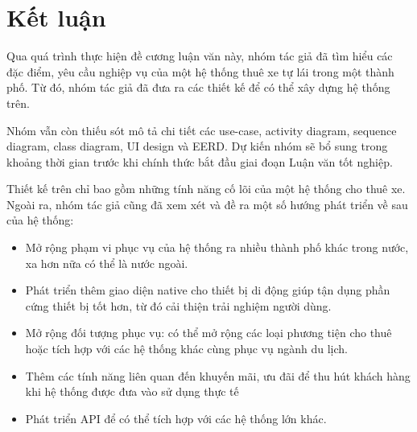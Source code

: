 \documentclass[../main.tex]{subfiles}
\begin{document}
	\chapter{Kết luận}
	\label{chap:conclusion}

	\justifying

	Qua quá trình thực hiện đề cương luận văn này, nhóm tác giả đã tìm hiểu các đặc điểm, yêu cầu nghiệp vụ của một hệ
	thống thuê xe tự lái trong một thành phố. Từ đó, nhóm tác giả đã đưa ra các thiết kế để có thể xây dựng hệ thống trên.

	Nhóm vẫn còn thiếu sót mô tả chi tiết các use-case, activity diagram, sequence diagram, class diagram, UI design và
	EERD. Dự kiến nhóm sẽ bổ sung trong khoảng thời gian trước khi chính thức bắt đầu giai đoạn Luận văn tốt nghiệp.

	Thiết kế trên chỉ bao gồm những tính năng cố lõi của một hệ thống cho thuê xe. Ngoài ra, nhóm tác giả cũng đã xem
	xét và đề ra một số hướng phát triển về sau của hệ thống:

	\begin{itemize}
		\item Mở rộng phạm vi phục vụ của hệ thống ra nhiều thành phố khác trong nước, xa hơn nữa có thể là nước ngoài.
		\item Phát triển thêm giao diện native cho thiết bị di động giúp tận dụng phần cứng thiết bị tốt hơn, từ đó cải
		thiện trải nghiệm người dùng.
		\item Mở rộng đối tượng phục vụ: có thể mở rộng các loại phương tiện cho thuê hoặc tích hợp với các hệ thống khác
		cùng phục vụ ngành du lịch.
		\item Thêm các tính năng liên quan đến khuyến mãi, ưu đãi để thu hút khách hàng khi hệ thống được đưa vào sử dụng
		thực tế
		\item Phát triển API để có thể tích hợp với các hệ thống lớn khác.
	\end{itemize}

	\newpage
\end{document}
